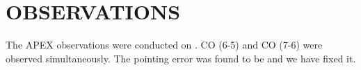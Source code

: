 \section{OBSERVATIONS}

The APEX observations were conducted on . CO (6-5) and CO (7-6) were observed simultaneously. The pointing error was found to be and we have fixed it.